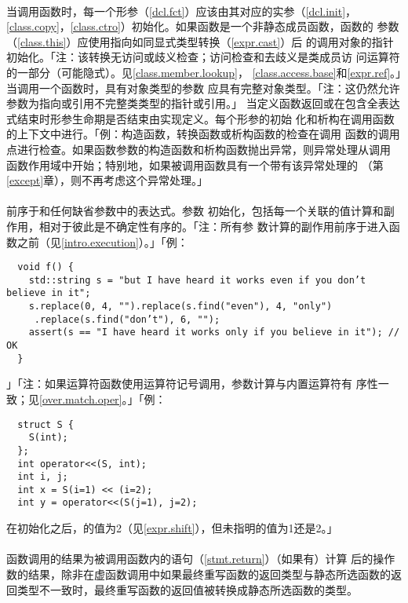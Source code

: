 \paragraph{}
当调用函数时，每一个形参（\ref{dcl.fct}）应该由其对应的实参（\ref{dcl.init}，
\ref{class.copy}，\ref{class.ctro}）初始化。如果函数是一个非静态成员函数，函数的
参数（\ref{class.this}）应使用指向如同显式类型转换（\ref{expr.cast}）后
的调用对象的指针初始化。「注：该转换无访问或歧义检查；访问检查和去歧义是类成员访
问运算符的一部分（可能隐式）。见\ref{class.member.lookup}，
\ref{class.access.base}和\ref{expr.ref}。」当调用一个函数时，具有对象类型的参数
应具有完整对象类型。「注：这仍然允许参数为指向或引用不完整类类型的指针或引用。」
当定义函数返回或在包含全表达式结束时形参生命期是否结束由实现定义。每个形参的初始
化和析构在调用函数的上下文中进行。「例：构造函数，转换函数或析构函数的检查在调用
函数的调用点进行检查。如果函数参数的构造函数和析构函数抛出异常，则异常处理从调用
函数作用域中开始；特别地，如果被调用函数具有一个带有该异常处理的
（第\ref{except}章），则不再考虑这个异常处理。」

\paragraph{}
前序于和任何缺省参数中的表达式。参数
初始化，包括每一个关联的值计算和副作用，相对于彼此是不确定性有序的。「注：所有参
数计算的副作用前序于进入函数之前（见\ref{intro.execution}）。」「例：
\begin{lstlisting}
  void f() {
    std::string s = "but I have heard it works even if you don’t believe in it";
    s.replace(0, 4, "").replace(s.find("even"), 4, "only")
     .replace(s.find("don’t"), 6, "");
    assert(s == "I have heard it works only if you believe in it"); // OK
  }
\end{lstlisting}」「注：如果运算符函数使用运算符记号调用，参数计算与内置运算符有
序性一致；见\ref{over.match.oper}。」「例：
\begin{lstlisting}
  struct S {
    S(int);
  };
  int operator<<(S, int);
  int i, j;
  int x = S(i=1) << (i=2);
  int y = operator<<(S(j=1), j=2);
\end{lstlisting}
在初始化之后，的值为2（见\ref{expr.shift}），但未指明的值为1还是2。」

\paragraph{}
函数调用的结果为被调用函数内的语句（\ref{stmt.return}）（如果有）计算
后的操作数的结果，除非在虚函数调用中如果最终重写函数的返回类型与静态所选函数的返
回类型不一致时，最终重写函数的返回值被转换成静态所选函数的类型。

